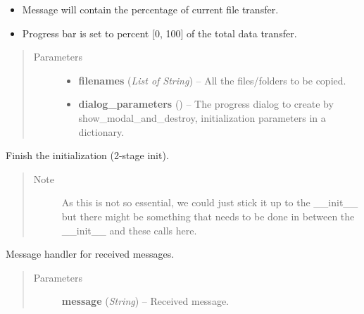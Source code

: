 \documentclass[letterpaper,10pt,english]{sphinxmanual}
\begin{document}
\begin{fulllineitems}
\begin{fulllineitems}
\begin{description}
\begin{itemize}
\item {} 
Message will contain the percentage of current file transfer.

\item {} 
Progress bar is set to percent {[}0, 100{]} of the total data             transfer.

\end{itemize}

\end{description}
\begin{quote}\begin{description}
\item[{Parameters}] \leavevmode\begin{itemize}
\item {} 
\textbf{filenames} (\emph{List of String}) -- All the files/folders to be copied.

\item {} 
\textbf{dialog\_parameters} () -- The progress dialog to create by show\_modal\_and\_destroy,
initialization parameters in a dictionary.

\end{itemize}

\end{description}\end{quote}

\end{fulllineitems}


\begin{fulllineitems}
\label{state:state.State.initialize}
Finish the initialization (2-stage init).
\begin{quote}\begin{description}
\item[{Note }] \leavevmode
As this is not so essential, we could just stick it up to
the \_\_init\_\_ but there might be something that needs to be
done in between the \_\_init\_\_ and these calls here.

\end{description}\end{quote}

\end{fulllineitems}


\begin{fulllineitems}
\label{state:state.State.message_handler}
Message handler for received messages.
\begin{quote}\begin{description}
\item[{Parameters}] \leavevmode
\textbf{message} (\emph{String}) -- Received message.


\end{description}
\end{quote}
\end{fulllineitems}
\end{fulllineitems}
\end{document}
